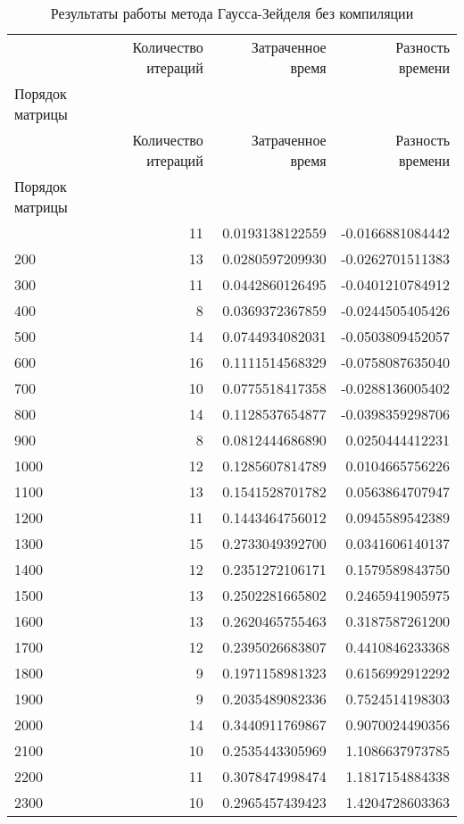 \begin{longtable}{lrrr}
\caption{Результаты работы метода Гаусса-Зейделя без компиляции}\\
\toprule
 & Количество итераций & Затраченное время & Разность времени \\
Порядок матрицы &  &  &  \\
\midrule
\endfirsthead
\toprule
 & Количество итераций & Затраченное время & Разность времени \\
Порядок матрицы &  &  &  \\
\midrule
\endhead
\midrule
\midrule
\endfoot
\bottomrule
\endlastfoot
100 & 11 & 0.0193138122559 & -0.0166881084442 \\
200 & 13 & 0.0280597209930 & -0.0262701511383 \\
300 & 11 & 0.0442860126495 & -0.0401210784912 \\
400 & 8 & 0.0369372367859 & -0.0244505405426 \\
500 & 14 & 0.0744934082031 & -0.0503809452057 \\
600 & 16 & 0.1111514568329 & -0.0758087635040 \\
700 & 10 & 0.0775518417358 & -0.0288136005402 \\
800 & 14 & 0.1128537654877 & -0.0398359298706 \\
900 & 8 & 0.0812444686890 & 0.0250444412231 \\
1000 & 12 & 0.1285607814789 & 0.0104665756226 \\
1100 & 13 & 0.1541528701782 & 0.0563864707947 \\
1200 & 11 & 0.1443464756012 & 0.0945589542389 \\
1300 & 15 & 0.2733049392700 & 0.0341606140137 \\
1400 & 12 & 0.2351272106171 & 0.1579589843750 \\
1500 & 13 & 0.2502281665802 & 0.2465941905975 \\
1600 & 13 & 0.2620465755463 & 0.3187587261200 \\
1700 & 12 & 0.2395026683807 & 0.4410846233368 \\
1800 & 9 & 0.1971158981323 & 0.6156992912292 \\
1900 & 9 & 0.2035489082336 & 0.7524514198303 \\
2000 & 14 & 0.3440911769867 & 0.9070024490356 \\
2100 & 10 & 0.2535443305969 & 1.1086637973785 \\
2200 & 11 & 0.3078474998474 & 1.1817154884338 \\
2300 & 10 & 0.2965457439423 & 1.4204728603363 \\

\end{longtable}
